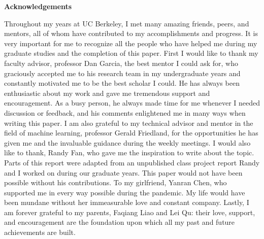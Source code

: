 \documentclass[12pt]{article}
\numberwithin{figure}{section} %
\begin{document}
\newpage
\thispagestyle{plain}
\begin{center}
\Large
\textbf{Acknowledgements}
\end{center}
Throughout my years at UC Berkeley, I met many amazing friends, peers, and mentors, all of whom have contributed to my accomplishments and progress. It is very important for me to recognize all the people who have helped me during my graduate studies and the completion of this paper. First I would like to thank my faculty advisor, professor Dan Garcia, the best mentor I could ask for, who graciously accepted me to his research team in my undergraduate years and constantly motivated me to be the best scholar I could. He has always been enthusiastic about my work and gave me tremendous support and encouragement. As a busy person, he always made time for me whenever I needed discussion or feedback, and his comments enlightened me in many ways when writing this paper. I am also grateful to my technical advisor and mentor in the field of machine learning, professor Gerald Friedland, for the opportunities he has given me and the invaluable guidance during the weekly meetings. I would also like to thank, Randy Fan, who gave me the inspiration to write about the topic. Parts of this report were adapted from an unpublished class project report Randy and I worked on during our graduate years. This paper would not have been possible without his contributions. To my girlfriend, Yanran Chen, who supported me in every way possible during the pandemic. My life would have been mundane without her immeasurable love and constant company. Lastly, I am forever grateful to my parents, Faqiang Liao and Lei Qu: their love, support, and encouragement are the foundation upon which all my past and future achievements are built.     

\newpage
\tableofcontents

\newpage
\end{document}
